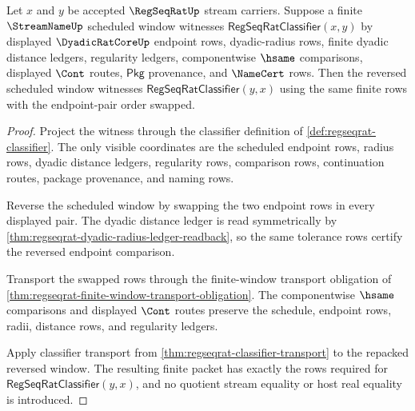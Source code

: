 \begin{theorem}
\label{thm:regseqrat-classifier-symmetric-finite-window}
Let $x$ and $y$ be accepted $\RegSeqRatUp$ stream carriers. Suppose a finite $\StreamNameUp$ scheduled window witnesses $\mathsf{RegSeqRatClassifier}(x,y)$ by displayed $\DyadicRatCoreUp$ endpoint rows, dyadic-radius rows, finite dyadic distance ledgers, regularity ledgers, componentwise $\hsame$ comparisons, displayed $\Cont$ routes, $\mathsf{Pkg}$ provenance, and $\NameCert$ rows. Then the reversed scheduled window witnesses $\mathsf{RegSeqRatClassifier}(y,x)$ using the same finite rows with the endpoint-pair order swapped.
\end{theorem}
\begin{proof}
Project the witness through the classifier definition of \autoref{def:regseqrat-classifier}. The only visible coordinates are the scheduled endpoint rows, radius rows, dyadic distance ledgers, regularity rows, comparison rows, continuation routes, package provenance, and naming rows.

Reverse the scheduled window by swapping the two endpoint rows in every displayed pair. The dyadic distance ledger is read symmetrically by \autoref{thm:regseqrat-dyadic-radius-ledger-readback}, so the same tolerance rows certify the reversed endpoint comparison.

Transport the swapped rows through the finite-window transport obligation of \autoref{thm:regseqrat-finite-window-transport-obligation}. The componentwise $\hsame$ comparisons and displayed $\Cont$ routes preserve the schedule, endpoint rows, radii, distance rows, and regularity ledgers.

Apply classifier transport from \autoref{thm:regseqrat-classifier-transport} to the repacked reversed window. The resulting finite packet has exactly the rows required for $\mathsf{RegSeqRatClassifier}(y,x)$, and no quotient stream equality or host real equality is introduced.
\end{proof}

